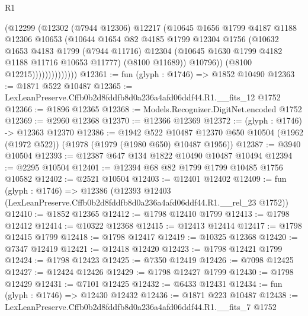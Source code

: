 \begin{lexlean}{R1}
\begin{coremodule}
                          (@12299
                            (@12302
                              (@7944 @12306)
                              @12217
                              (@10645
                                @1656
                                @1799
                                @4187
                                @1188
                                @12306
                                @10653
                                (@10644
                                  @1654
                                  @82
                                  @4185
                                  @1799
                                  @12304
                                  @1756
                                  (@10632
                                    @1653
                                    @4183
                                    @1799
                                    (@7944 @11716)
                                    @12304
                                    (@10645 @1630 @1799 @4182 @1188 @11716 @10653 @11777)
                                    (@8100 @11689))
                                  @10796))
                              (@8100 @12215))))))))))))))
@12361 := fun (glyph : @1746) => @1852 @10490
@12363 := @1871 @522 @10487
@12365 := LexLeanPreserve.Cffb0b2d8fddfb8d0a236a4afd06ddf44.R1.__fits_12 @1752
@12366 := @1896 @12365
@12368 := Models.Recognizer.DigitNet.encoded @1752
@12369 := @2960 @12368
@12370 := @12366 @12369
@12372 := (glyph : @1746) -> @12363 @12370
@12386 := @1942
    @522
    @10487
    @12370
    @650
    @10504
    (@1962 (@1972 @522))
    (@1978 (@1979 (@1980 @650) @10487 @1956))
@12387 := @3940 @10504
@12393 := @12387 @647 @134 @1822 @10490 @10487 @10494
@12394 := @2295 @10504
@12401 := @12394 @68 @82 @1799 @1799 @10485 @1756 @10582
@12402 := @2521 @10504
@12403 := @12401 @12402
@12409 := fun (glyph : @1746) =>
  @12386 (@12393 @12403 (LexLeanPreserve.Cffb0b2d8fddfb8d0a236a4afd06ddf44.R1.__rel_23 @1752))
@12410 := @1852 @12365
@12412 := @1798 @12410 @1799
@12413 := @1798 @12412
@12414 := @10322 @12368
@12415 := @12413 @12414
@12417 := @1798 @12415 @1799
@12418 := @1798 @12417
@12419 := @10325 @12368
@12420 := @7347 @12419
@12421 := @12418 @12420
@12423 := @1798 @12421 @1799
@12424 := @1798 @12423
@12425 := @7350 @12419
@12426 := @7098 @12425
@12427 := @12424 @12426
@12429 := @1798 @12427 @1799
@12430 := @1798 @12429
@12431 := @7101 @12425
@12432 := @6433 @12431
@12434 := fun (glyph : @1746) => @12430 @12432
@12436 := @1871 @223 @10487
@12438 := LexLeanPreserve.Cffb0b2d8fddfb8d0a236a4afd06ddf44.R1.__fits_7 @1752

\end{coremodule}
\end{lexlean}
